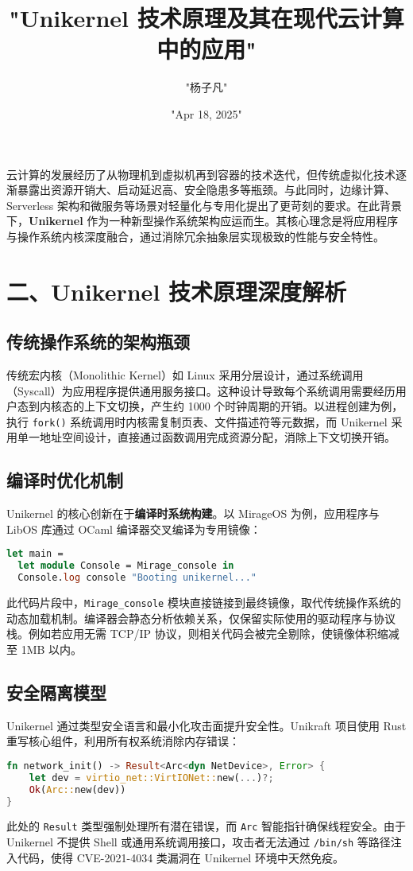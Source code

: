 \title{"Unikernel 技术原理及其在现代云计算中的应用"}
\author{"杨子凡"}
\date{"Apr 18, 2025"}
\maketitle
云计算的发展经历了从物理机到虚拟机再到容器的技术迭代，但传统虚拟化技术逐渐暴露出资源开销大、启动延迟高、安全隐患多等瓶颈。与此同时，边缘计算、Serverless 架构和微服务等场景对轻量化与专用化提出了更苛刻的要求。在此背景下，\textbf{Unikernel} 作为一种新型操作系统架构应运而生。其核心理念是将应用程序与操作系统内核深度融合，通过消除冗余抽象层实现极致的性能与安全特性。\par
\chapter{二、Unikernel 技术原理深度解析}
\section{传统操作系统的架构瓶颈}
传统宏内核（Monolithic Kernel）如 Linux 采用分层设计，通过系统调用（Syscall）为应用程序提供通用服务接口。这种设计导致每个系统调用需要经历用户态到内核态的上下文切换，产生约 1000 个时钟周期的开销。以进程创建为例，执行 \verb!fork()! 系统调用时内核需复制页表、文件描述符等元数据，而 Unikernel 采用单一地址空间设计，直接通过函数调用完成资源分配，消除上下文切换开销。\par
\section{编译时优化机制}
Unikernel 的核心创新在于\textbf{编译时系统构建}。以 MirageOS 为例，应用程序与 LibOS 库通过 OCaml 编译器交叉编译为专用镜像：\par
\begin{lstlisting}[language=ocaml]
let main = 
  let module Console = Mirage_console in
  Console.log console "Booting unikernel..." 
\end{lstlisting}
此代码片段中，\verb!Mirage_console! 模块直接链接到最终镜像，取代传统操作系统的动态加载机制。编译器会静态分析依赖关系，仅保留实际使用的驱动程序与协议栈。例如若应用无需 TCP/IP 协议，则相关代码会被完全剔除，使镜像体积缩减至 1MB 以内。\par
\section{安全隔离模型}
Unikernel 通过类型安全语言和最小化攻击面提升安全性。Unikraft 项目使用 Rust 重写核心组件，利用所有权系统消除内存错误：\par
\begin{lstlisting}[language=rust]
fn network_init() -> Result<Arc<dyn NetDevice>, Error> {
    let dev = virtio_net::VirtIONet::new(...)?;
    Ok(Arc::new(dev))
}
\end{lstlisting}
此处的 \verb!Result! 类型强制处理所有潜在错误，而 \verb!Arc! 智能指针确保线程安全。由于 Unikernel 不提供 Shell 或通用系统调用接口，攻击者无法通过 \verb!/bin/sh! 等路径注入代码，使得 CVE-2021-4034 类漏洞在 Unikernel 环境中天然免疫。\par
